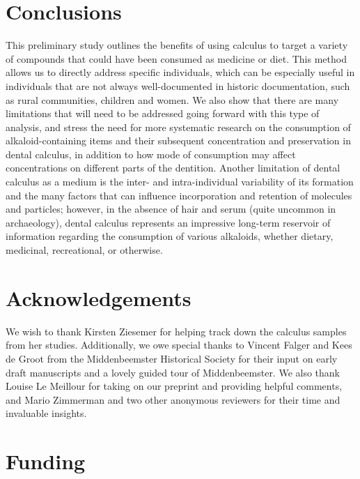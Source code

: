 \documentclass[
]{article}
\begin{document}
\hypertarget{conclusions}{%
\section{Conclusions}\label{conclusions}}

This preliminary study outlines the benefits of using calculus to target
a variety of compounds that could have been consumed as medicine or
diet. This method allows us to directly address specific individuals,
which can be especially useful in individuals that are not always
well-documented in historic documentation, such as rural communities,
children and women. We also show that there are many limitations that
will need to be addressed going forward with this type of analysis, and
stress the need for more systematic research on the consumption of
alkaloid-containing items and their subsequent concentration and
preservation in dental calculus, in addition to how mode of consumption
may affect concentrations on different parts of the dentition. Another
limitation of dental calculus as a medium is the inter- and
intra-individual variability of its formation and the many factors that
can influence incorporation and retention of molecules and particles;
however, in the absence of hair and serum (quite uncommon in
archaeology), dental calculus represents an impressive long-term
reservoir of information regarding the consumption of various alkaloids,
whether dietary, medicinal, recreational, or otherwise.

\hypertarget{acknowledgements}{%
\section*{Acknowledgements}\label{acknowledgements}}

We wish to thank Kirsten Ziesemer for helping track down the calculus
samples from her studies. Additionally, we owe special thanks to Vincent
Falger and Kees de Groot from the Middenbeemster Historical Society for
their input on early draft manuscripts and a lovely guided tour of
Middenbeemster. We also thank Louise Le Meillour for taking on our
preprint and providing helpful comments, and Mario Zimmerman and two
other anonymous reviewers for their time and invaluable insights.

\hypertarget{funding}{%
\section*{Funding}\label{funding}}
\end{document}
